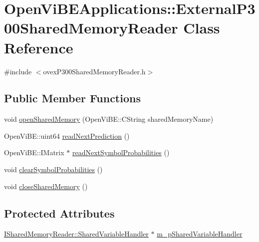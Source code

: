 \hypertarget{classOpenViBEApplications_1_1ExternalP300SharedMemoryReader}{
\section{OpenViBEApplications::ExternalP300SharedMemoryReader Class Reference}
\label{classOpenViBEApplications_1_1ExternalP300SharedMemoryReader}
}


{\ttfamily \#include $<$ovexP300SharedMemoryReader.h$>$}

\subsection*{Public Member Functions}
\begin{DoxyCompactItemize}
\item 
void \hyperlink{classOpenViBEApplications_1_1ExternalP300SharedMemoryReader_aada4721a8bb7d50de043057ca84b05d9}{openSharedMemory} (OpenViBE::CString sharedMemoryName)
\item 
OpenViBE::uint64 \hyperlink{classOpenViBEApplications_1_1ExternalP300SharedMemoryReader_ad7c8a544f8594bb2be25560b9ba85968}{readNextPrediction} ()
\item 
OpenViBE::IMatrix $\ast$ \hyperlink{classOpenViBEApplications_1_1ExternalP300SharedMemoryReader_aac10b106714ded970f0cbc346d6f7bb4}{readNextSymbolProbabilities} ()
\item 
void \hyperlink{classOpenViBEApplications_1_1ExternalP300SharedMemoryReader_ae898ff95b42f869e1c3e31fe600c9490}{clearSymbolProbabilities} ()
\item 
void \hyperlink{classOpenViBEApplications_1_1ExternalP300SharedMemoryReader_a27a337ef5680aa42e4324c3e19828a94}{closeSharedMemory} ()
\end{DoxyCompactItemize}
\subsection*{Protected Attributes}
\begin{DoxyCompactItemize}
\item 
\hyperlink{classOpenViBEApplications_1_1ISharedMemoryReader_1_1SharedVariableHandler}{ISharedMemoryReader::SharedVariableHandler} $\ast$ \hyperlink{classOpenViBEApplications_1_1ExternalP300SharedMemoryReader_a6654049504b094e79f0cffeb4cc8ce62}{m\_\-pSharedVariableHandler}
\end{DoxyCompactItemize}


